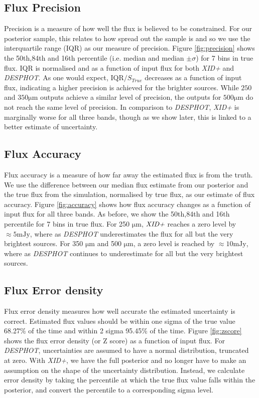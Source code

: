 \documentclass[useAMS,usenatbib]{mnras}
\begin{document}
\subsection{Flux Precision}
Precision is a measure of how well the flux is believed to be constrained. For our posterior sample, this relates to how spread out the sample is and so we use the interquartile range (IQR) as our measure of precision. Figure \ref{fig:precision} shows the 50th,84th and 16th percentile (i.e. median and median $\pm \sigma$) for 7 bins in true flux. IQR is normalised and as a function of input flux for both \emph{XID+} and \emph{DESPHOT}. As one would expect, $\mathrm{IQR}/S_{True}$ decreases as a function of input flux, indicating a higher precision is achieved for the brighter sources. While $250$ and $350\mathrm{\mu m}$ outputs achieve a similar level of precision, the outputs for $500 \mathrm{\mu m}$ do not reach the same level of precision. In comparison to \emph{DESPHOT}, \emph{XID+} is marginally worse for all three bands, though as we show later, this is linked to a better estimate of uncertainty. 

\subsection{Flux Accuracy}
Flux accuracy is a measure of how far away the estimated flux is from the truth. We use the difference between our median flux estimate from our posterior and the true flux from the simulation, normalised by true flux, as our estimate of flux accuracy. Figure \ref{fig:accuracy} shows how flux accuracy changes as a function of input flux for all three bands. As before, we show the 50th,84th and 16th percentile for 7 bins in true flux. For 250 $\mathrm{\mu m}$, $\emph{XID+}$ reaches a zero level by $\approx 5 \mathrm{mJy}$, where as \emph{DESPHOT} underestimates the flux for all but the very brightest sources. For 350 $\mathrm{\mu m}$ and 500 $\mathrm{\mu m}$, a zero level is reached by $\approx10 \mathrm{mJy}$, where as \emph{DESPHOT} continues to underestimate for all but the very brightest sources.

\subsection{Flux Error density}
Flux error density measures how well accurate the estimated uncertainty is correct. Estimated flux values should be within one sigma of the true value 68.27\% of the time and within 2 sigma 95.45\% of the time. Figure \ref{fig:zscore} shows the flux error density (or Z score) as a function of input flux. For \emph{DESPHOT}, uncertainties are assumed to have a normal distribution, truncated at zero. With \emph{XID+}, we have the full posterior and no longer have to make an assumption on the shape of the uncertainty distribution. Instead, we calculate error density by taking the percentile at which the true flux value falls within the posterior, and convert the percentile to a corresponding sigma level.
\end{document}
